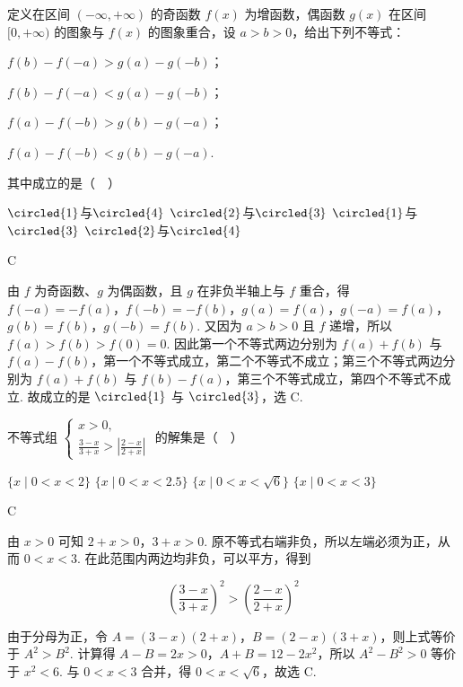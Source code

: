 \begin{problem}
定义在区间 \((-\infty, +\infty)\) 的奇函数 \(f(x)\) 为增函数，偶函数 \(g(x)\) 在区间 \([0, +\infty)\) 的图象与 \(f(x)\) 的图象重合，设 \(a > b > 0\)，给出下列不等式：

\begin{circlelist}
\item \(f(b)-f(-a)>g(a)-g(-b)\)；
\item \(f(b)-f(-a)<g(a)-g(-b)\)；
\item \(f(a)-f(-b)>g(b)-g(-a)\)；
\item \(f(a)-f(-b)<g(b)-g(-a)\).
\end{circlelist}

其中成立的是（\(\quad\)）

\choices
    {\(\circled{1}\)与\(\circled{4}\)}
    {\(\circled{2}\)与\(\circled{3}\)}
    {\(\circled{1}\)与\(\circled{3}\)}
    {\(\circled{2}\)与\(\circled{4}\)}
\end{problem}

\begin{answer}
C
\end{answer}

\begin{solution}
由 \(f\) 为奇函数、\(g\) 为偶函数，且 \(g\) 在非负半轴上与 \(f\) 重合，得 \(f(-a)=-f(a)\)，\(f(-b)=-f(b)\)，\(g(a)=f(a)\)，\(g(-a)=f(a)\)，\(g(b)=f(b)\)，\(g(-b)=f(b)\). 又因为 \(a>b>0\) 且 \(f\) 递增，所以 \(f(a)>f(b)>f(0)=0\). 因此第一个不等式两边分别为 \(f(a)+f(b)\) 与 \(f(a)-f(b)\)，第一个不等式成立，第二个不等式不成立；第三个不等式两边分别为 \(f(a)+f(b)\) 与 \(f(b)-f(a)\)，第三个不等式成立，第四个不等式不成立. 故成立的是 \(\circled{1}\) 与 \(\circled{3}\)，选 C.
\end{solution}

\begin{problem}
不等式组 \(\begin{cases}
x>0,\\
\frac{3-x}{3+x} > \left|\frac{2-x}{2+x}\right|
\end{cases}\) 的解集是（\(\quad\)）

\choices
    {\(\{x \mid 0 < x < 2\}\)}
    {\(\{x \mid 0 < x < 2.5\}\)}
    {\(\{x \mid 0 < x < \sqrt{6}\}\)}
    {\(\{x \mid 0 < x < 3\}\)}
\end{problem}

\begin{answer}
C
\end{answer}

\begin{solution}
由 \(x>0\) 可知 \(2+x>0\)，\(3+x>0\). 原不等式右端非负，所以左端必须为正，从而 \(0<x<3\). 在此范围内两边均非负，可以平方，得到

\[
\left(\frac{3-x}{3+x}\right)^{2}>\left(\frac{2-x}{2+x}\right)^{2}
\]

由于分母为正，令 \(A=(3-x)(2+x)\)，\(B=(2-x)(3+x)\)，则上式等价于 \(A^{2}>B^{2}\). 计算得 \(A-B=2x>0\)，\(A+B=12-2x^{2}\)，所以 \(A^{2}-B^{2}>0\) 等价于 \(x^{2}<6\). 与 \(0<x<3\) 合并，得 \(0<x<\sqrt{6}\)，故选 C.
\end{solution}

